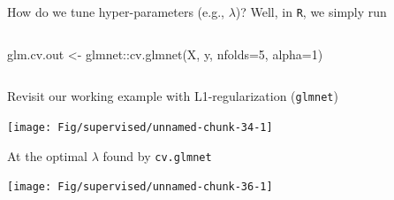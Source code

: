 \documentclass[
  ignorenonframetext,
  aspectratio=169]{beamer}
\newenvironment{Shaded}{\begin{snugshade}}{\end{snugshade}}
\newcommand{\AttributeTok}[1]{\textcolor[rgb]{0.77,0.63,0.00}{#1}}
\newcommand{\DecValTok}[1]{\textcolor[rgb]{0.00,0.00,0.81}{#1}}
\newcommand{\FunctionTok}[1]{\textcolor[rgb]{0.00,0.00,0.00}{#1}}
\newcommand{\NormalTok}[1]{#1}
\newcommand{\OtherTok}[1]{\textcolor[rgb]{0.56,0.35,0.01}{#1}}
\newcommand{\SpecialCharTok}[1]{\textcolor[rgb]{0.00,0.00,0.00}{#1}}
\begin{document}
\begin{frame}[fragile]{How do we tune hyper-parameters (e.g.,
\(\lambda\))?}
\protect\hypertarget{how-do-we-tune-hyper-parameters-e.g.-lambda}{}
Well, in \texttt{R}, we simply run

\begin{columns}[T]
\begin{column}{.35\textwidth}
\large

\begin{Shaded}
\begin{Highlighting}[]
\NormalTok{glm.cv.out }\OtherTok{\textless{}{-}}
\NormalTok{ glmnet}\SpecialCharTok{::}\FunctionTok{cv.glmnet}\NormalTok{(X,}
\NormalTok{          y,}
          \AttributeTok{nfolds=}\DecValTok{5}\NormalTok{,}
          \AttributeTok{alpha=}\DecValTok{1}\NormalTok{)}
\end{Highlighting}
\end{Shaded}

\normalsize
\end{column}

\begin{column}{.55\textwidth}
\scriptsize


\normalsize
\end{column}
\end{columns}
\end{frame}

\begin{frame}{Revisit our working example with L1-regularization
(\texttt{glmnet})}
\protect\hypertarget{revisit-our-working-example-with-l1-regularization-glmnet}{}
\scriptsize

\begin{center}\texttt{[image: Fig/supervised/unnamed-chunk-34-1]} \end{center}

\normalsize
\end{frame}

\begin{frame}{At the optimal \(\lambda\) found by \texttt{cv.glmnet}}
\protect\hypertarget{at-the-optimal-lambda-found-by-cv.glmnet}{}
\scriptsize

\normalsize

\scriptsize

\begin{center}\texttt{[image: Fig/supervised/unnamed-chunk-36-1]} \end{center}

\normalsize
\end{frame}
\end{document}
